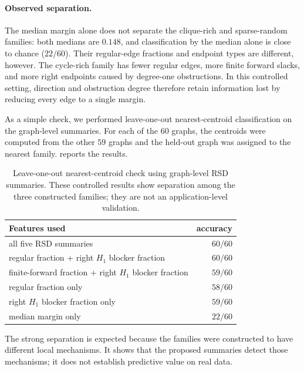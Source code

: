 \documentclass[11pt,letterpaper]{article}
\theoremstyle{definition}
\begin{document}
\paragraph{Observed separation.}
The median margin alone does not separate the clique-rich and sparse-random
families: both medians are $0.148$, and classification by the median alone is
close to chance ($22/60$). Their regular-edge fractions and endpoint types are
different, however. The cycle-rich family has fewer regular edges, more finite forward
slacks, and more right endpoints caused by degree-one obstructions. In this
controlled setting, direction and obstruction degree therefore retain
information lost by reducing every edge to a single margin.

As a simple check, we performed leave-one-out nearest-centroid classification
on the graph-level summaries. For each of the $60$ graphs, the centroids were
computed from the other $59$ graphs and the held-out graph was assigned to the
nearest family.  reports the results.

\begin{table}[ht]
\centering
\scriptsize
\setlength{\tabcolsep}{5pt}
\renewcommand{\arraystretch}{1.05}
\begin{tabular}{@{}lr@{}}
\toprule
Features used & accuracy \\
\midrule
all five RSD summaries & \(60/60\) \\
regular fraction + right \(H_1\) blocker fraction & \(60/60\) \\
finite-forward fraction + right \(H_1\) blocker fraction & \(59/60\) \\
regular fraction only & \(58/60\) \\
right \(H_1\) blocker fraction only & \(59/60\) \\
median margin only & \(22/60\) \\
\bottomrule
\end{tabular}
\caption{Leave-one-out nearest-centroid check using graph-level RSD summaries.
These controlled results show separation among the three constructed families;
they are not an application-level validation.}
\label{tab:rsd-structural-classification}
\end{table}


The strong separation is expected because the families were constructed to
have different local mechanisms. It shows that the proposed summaries detect
those mechanisms; it does not establish predictive value on real data.
\end{document}
